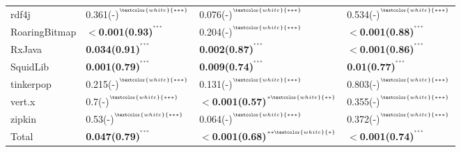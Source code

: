 \begin{tabular}{llll}
rdf4j               &  0.361(-)\tiny{$^{^{\textcolor{white}{***}}}$} &  0.076(-)\tiny{$^{^{\textcolor{white}{***}}}$} &  0.534(-)\tiny{$^{^{\textcolor{white}{***}}}$} \\
RoaringBitmap       &  \textbf{$<$0.001(0.93)}\tiny{$^{^{***}}$} &  0.204(-)\tiny{$^{^{\textcolor{white}{***}}}$} &  \textbf{$<$0.001(0.88)}\tiny{$^{^{***}}$} \\
RxJava              &  \textbf{0.034(0.91)}\tiny{$^{^{***}}$} &  \textbf{0.002(0.87)}\tiny{$^{^{***}}$} &  \textbf{$<$0.001(0.86)}\tiny{$^{^{***}}$} \\
SquidLib            &  \textbf{0.001(0.79)}\tiny{$^{^{***}}$} &  \textbf{0.009(0.74)}\tiny{$^{^{***}}$} &  \textbf{0.01(0.77)}\tiny{$^{^{***}}$} \\
tinkerpop           &  0.215(-)\tiny{$^{^{\textcolor{white}{***}}}$} &  0.131(-)\tiny{$^{^{\textcolor{white}{***}}}$} &  0.803(-)\tiny{$^{^{\textcolor{white}{***}}}$} \\
vert.x              &  0.7(-)\tiny{$^{^{\textcolor{white}{***}}}$} &  \textbf{$<$0.001(0.57)}\tiny{$^{^{*\textcolor{white}{**}}}$} &  0.355(-)\tiny{$^{^{\textcolor{white}{***}}}$} \\
zipkin              &  0.53(-)\tiny{$^{^{\textcolor{white}{***}}}$} &  0.064(-)\tiny{$^{^{\textcolor{white}{***}}}$} &  0.372(-)\tiny{$^{^{\textcolor{white}{***}}}$} \\
Total               &  \textbf{0.047(0.79)}\tiny{$^{^{***}}$} &  \textbf{$<$0.001(0.68)}\tiny{$^{^{**\textcolor{white}{*}}}$} &  \textbf{$<$0.001(0.74)}\tiny{$^{^{***}}$} \\
\bottomrule
\end{tabular}
